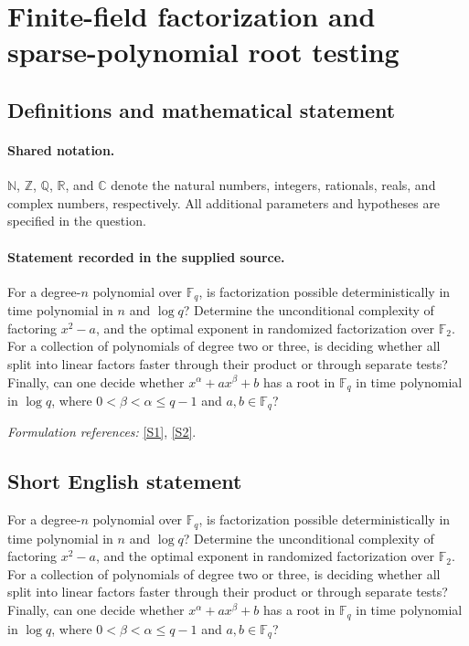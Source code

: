 \documentclass[11pt]{article}
\newcommand{\sref}[2]{\hyperlink{source:#1:#2}{[S#2]}}
\begin{document}
\section{Finite-field factorization and sparse-polynomial root testing}\label{statement}

\subsection{Definitions and mathematical statement}

\paragraph{Shared notation.}$\mathbb N$, $\mathbb Z$, $\mathbb Q$, $\mathbb R$, and $\mathbb C$ denote the natural numbers, integers, rationals, reals, and complex numbers, respectively. All additional parameters and hypotheses are specified in the question.


\paragraph{Statement recorded in the supplied source.}
For a degree-$n$ polynomial over $\mathbb F_q$, is factorization possible deterministically in time polynomial in $n$ and $\log q$? Determine the unconditional complexity of factoring $x^2-a$, and the optimal exponent in randomized factorization over $\mathbb F_2$. For a collection of polynomials of degree two or three, is deciding whether all split into linear factors faster through their product or through separate tests? Finally, can one decide whether $x^\alpha+ax^\beta+b$ has a root in $\mathbb F_q$ in time polynomial in $\log q$, where $0<\beta<\alpha\leq q-1$ and $a,b\in\mathbb F_q$?
\par\smallskip\textit{Formulation references:} \sref{statement}{1}, \sref{statement}{2}.
\subsection{Short English statement}
For a degree-$n$ polynomial over $\mathbb F_q$, is factorization possible deterministically in time polynomial in $n$ and $\log q$? Determine the unconditional complexity of factoring $x^2-a$, and the optimal exponent in randomized factorization over $\mathbb F_2$. For a collection of polynomials of degree two or three, is deciding whether all split into linear factors faster through their product or through separate tests? Finally, can one decide whether $x^\alpha+ax^\beta+b$ has a root in $\mathbb F_q$ in time polynomial in $\log q$, where $0<\beta<\alpha\leq q-1$ and $a,b\in\mathbb F_q$?
\end{document}
